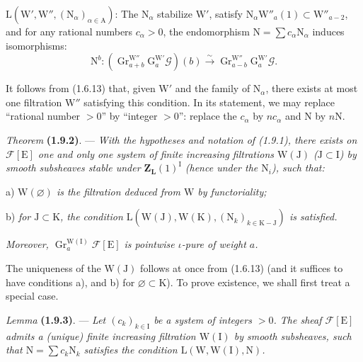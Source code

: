 \documentclass[11pt,leqno]{article}
\begin{document}
\(\mathrm{L}(\mathrm{W}',\mathrm{W}'',(\mathrm{N}_\alpha)_{\alpha\in\mathrm{A}})\): The \(\mathrm{N}_\alpha\) stabilize \(\mathrm{W}'\), satisfy \(\mathrm{N}_\alpha\mathrm{W}''_a(1)\subset\mathrm{W}''_{a-2}\), and for any rational numbers \(c_\alpha>0\), the endomorphism \(\mathrm{N}=\sum c_\alpha\mathrm{N}_\alpha\) induces isomorphisms:
\[
\mathrm{N}^b:
(\operatorname{Gr}_{a+b}^{\mathrm{W}''}\mathrm{G}_a^{\mathrm{W}'}\mathscr{G})(b)
\xrightarrow{\sim}
\operatorname{Gr}_{a-b}^{\mathrm{W}''}\mathrm{G}_a^{\mathrm{W}'}\mathscr{G}.
\]

It follows from (1.6.13) that, given \(\mathrm{W}'\) and the family of \(\mathrm{N}_\alpha\), there exists at most one filtration \(\mathrm{W}''\) satisfying this condition. In its statement, we may replace “rational number \(>0\)” by “integer \(>0\)”: replace the \(c_\alpha\) by \(nc_\alpha\) and \(\mathrm{N}\) by \(n\mathrm{N}\).

\textit{Theorem} \textbf{(1.9.2)}. — \textit{With the hypotheses and notation of \textup{(1.9.1)}, there exists on \(\mathscr{F}[\mathrm{E}]\) one and only one system of finite increasing filtrations \(\mathrm{W}(\mathrm{J})\) (\(\mathrm{J}\subset\mathrm{I}\)) by smooth subsheaves stable under \(\mathbf{Z}_{\mathbf{L}}(1)^{\mathrm{I}}\) (hence under the \(\mathrm{N}_i\)), such that:}

\noindent a) \textit{\(\mathrm{W}(\varnothing)\) is the filtration deduced from \(\mathrm{W}\) by functoriality;}

\noindent b) \textit{for \(\mathrm{J}\subset\mathrm{K}\), the condition \(\mathrm{L}(\mathrm{W}(\mathrm{J}),\mathrm{W}(\mathrm{K}),(\mathrm{N}_k)_{k\in\mathrm{K}-\mathrm{J}})\) is satisfied.}

\noindent\textit{Moreover, \(\operatorname{Gr}_a^{\mathrm{W}(\mathrm{I})}\mathscr{F}[\mathrm{E}]\) is pointwise \(\iota\)-pure of weight \(a\).}

The uniqueness of the \(\mathrm{W}(\mathrm{J})\) follows at once from (1.6.13) (and it suffices to have conditions a), and b) for \(\varnothing\subset\mathrm{K}\)). To prove existence, we shall first treat a special case.

\textit{Lemma} \textbf{(1.9.3)}. — \textit{Let \((c_k)_{k\in\mathrm{I}}\) be a system of integers \(>0\). The sheaf \(\mathscr{F}[\mathrm{E}]\) admits a (unique) finite increasing filtration \(\mathrm{W}(\mathrm{I})\) by smooth subsheaves, such that \(\mathrm{N}=\sum c_k\mathrm{N}_k\) satisfies the condition \(\mathrm{L}(\mathrm{W},\mathrm{W}(\mathrm{I}),\mathrm{N})\).}
\end{document}
